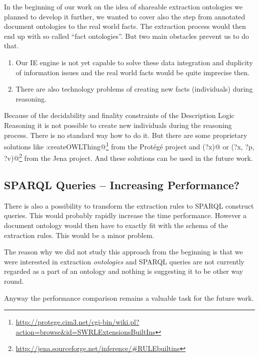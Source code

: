 In the beginning of our work on the idea of shareable extraction ontologies we planned to develop it further, we wanted to cover also the step from annotated document ontologies to the real world facts. The extraction process would then end up with so called ``fact ontologies''. But two main obstacles prevent us to do that.

\begin{enumerate}
	\item Our IE engine is not yet capable to solve these data integration and duplicity of information issues and the real world facts would be quite imprecise then.
	\item There are also technology problems of creating new facts (individuals) during reasoning.
\end{enumerate}

Because of the decidability and finality constraints of the Description Logic Reasoning it is not possible to create new individuals during the reasoning process. There is no standard way how to do it. But there are some proprietary solutions like \verb@swrlx:createOWLThing@\footnote{\url{http://protege.cim3.net/cgi-bin/wiki.pl?action=browse&id=SWRLExtensionsBuiltIns}} from the Prot\'{e}g\'{e} project and \verb@makeTemp(?x)@ or \verb@makeInstance(?x, ?p, ?v)@\footnote{\url{http://jena.sourceforge.net/inference/#RULEbuiltins}} from the Jena project.
And these solutions can be used in the future work. 

\subsection{SPARQL Queries -- Increasing Performance?}

There is also a possibility to transform the extraction rules to SPARQL construct queries. This would probably rapidly increase the time performance. However a document ontology would then have to exactly fit with the schema of the extraction rules.  This would be a minor problem. 

The reason why we did not study this approach from the beginning is that we were interested in extraction \emph{ontologies} and SPARQL queries are not currently regarded as a part of an ontology and nothing is suggesting it to be other way round.  

Anyway the performance comparison remains a valuable task for the future work.

